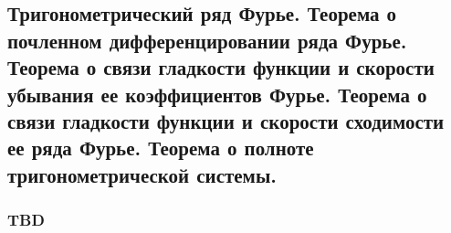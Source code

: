\subsection{Тригонометрический ряд Фурье. Теорема о почленном дифференцировании ряда Фурье. Теорема о связи гладкости функции и скорости убывания ее коэффициентов Фурье. Теорема о связи гладкости функции и скорости сходимости ее ряда Фурье. Теорема о полноте тригонометрической системы.}

\subsubsection{TBD}